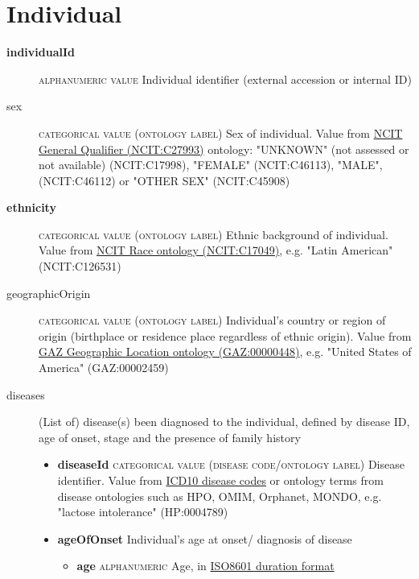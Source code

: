 \documentclass[a4paper, 10pt]{article}        %
\begin{document}
\section*{{\color{teal} Individual}}
\begin{description}
	\item[\textbf{individualId}]  {\textsc{alphanumeric value}} Individual identifier (external accession or internal ID)
	\item[sex] {\textsc{categorical value (ontology label)}} Sex of individual. Value from \href{https://www.ebi.ac.uk/ols/ontologies/ncit/terms?iri=http%3A%2F%2Fpurl.obolibrary.org%2Fobo%2FNCIT_C27993&viewMode=All&siblings=false}{NCIT General Qualifier (NCIT:C27993)} ontology: "UNKNOWN" (not assessed or not available) (NCIT:C17998), "FEMALE" (NCIT:C46113), "MALE", (NCIT:C46112) or "OTHER SEX" (NCIT:C45908)
	\item[\textbf{ethnicity}] {\textsc{categorical value (ontology label)}} Ethnic background of individual. Value from \href{https://www.ebi.ac.uk/ols/ontologies/ncit/terms?iri=http%3A%2F%2Fpurl.obolibrary.org%2Fobo%2FNCIT_C17049}{NCIT Race ontology (NCIT:C17049)}, e.g. "Latin American" (NCIT:C126531)
	\item[geographicOrigin] {\textsc{categorical value (ontology label)}} Individual's country or region of origin (birthplace or residence place regardless of ethnic origin). Value from \href{https://www.ebi.ac.uk/ols/ontologies/gaz/terms?iri=http%3A%2F%2Fpurl.obolibrary.org%2Fobo%2FGAZ_00000448}{GAZ Geographic Location ontology (GAZ:00000448)}, e.g. "United States of America" (GAZ:00002459)
	\item[diseases] (List of) disease(s) been diagnosed to the individual, defined by disease ID, age of onset, stage and the presence of family history
	\begin{itemize}
			\item[]  \textbf{diseaseId} {\textsc{categorical value (disease code/ontology label)}} Disease identifier. Value from \href{https://www.who.int/classifications/icd/en/}{ICD10 disease codes} or ontology terms from disease ontologies such as HPO, OMIM, Orphanet, MONDO, e.g. "lactose intolerance" (HP:0004789)
			\item[]  \textbf{ageOfOnset} Individual's age at onset/ diagnosis of disease
			\begin{itemize}
			\item[] \textbf{age} {\textsc{alphanumeric}} Age, in \href{https://www.iso.org/iso-8601-date-and-time-format.html}{ISO8601 duration format}  

\end{itemize}
\end{itemize}
\end{description}
\end{document}
